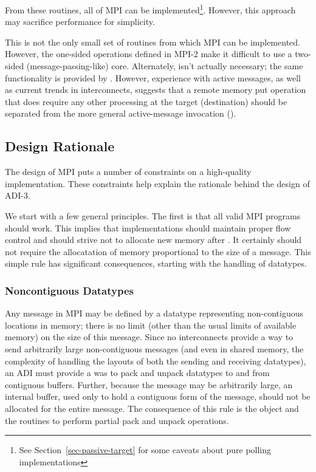 \documentclass{article}
\begin{document}
From these routines, all of MPI can be implemented\footnote{See
Section~\ref{sec-passive-target} for some caveats about pure polling
implementations}.  However, this approach may sacrifice performance
for simplicity.  

This is not the only small set of routines from which MPI can be
implemented.  However, the one-sided operations defined in MPI-2 make
it difficult to use a two-sided (message-passing-like) core.
Alternately,  isn't actually necessary; the same
functionality is provided by .  However, experience
with active messages, as well as current trends in interconnects,
suggests that a remote memory put operation that does require any
other processing at the target (destination) should be separated from
the more general active-message invocation ().

\subsection{Design Rationale}
\label{sec-intermediate}
The design of MPI puts a number of constraints on a high-quality
implementation.  These constraints help explain the rationale behind
the design of ADI-3.

We start with a few general principles.  The first is that all valid
MPI programs should work.  This implies that implementations should
maintain proper flow control and should strive not to allocate new
memory after .  It certainly should not require
the allocatation of memory proportional to the size of a message.
This simple rule has significant consequences, starting with the
handling of datatypes.

\subsubsection{Noncontiguous Datatypes}
Any message in MPI may be defined by a datatype representing
non-contiguous locations in memory; there is no limit (other than the
usual limits of available memory) on the size of this message.  Since
no interconnects provide a way to send arbitrarily large
non-contiguous messages (and even in shared memory, the complexity of
handling the layouts of both the sending and receiving datatypes), an
ADI must provide a was to pack and unpack datatypes to and from
contiguous buffers.  
Further, because the message may be arbitrarily large, an internal
buffer,
used only to hold a contiguous form of the message, should
not be allocated for the entire message.
The consequence of this rule is the  object and the
routines to perform partial pack and unpack operations.
\end{document}
